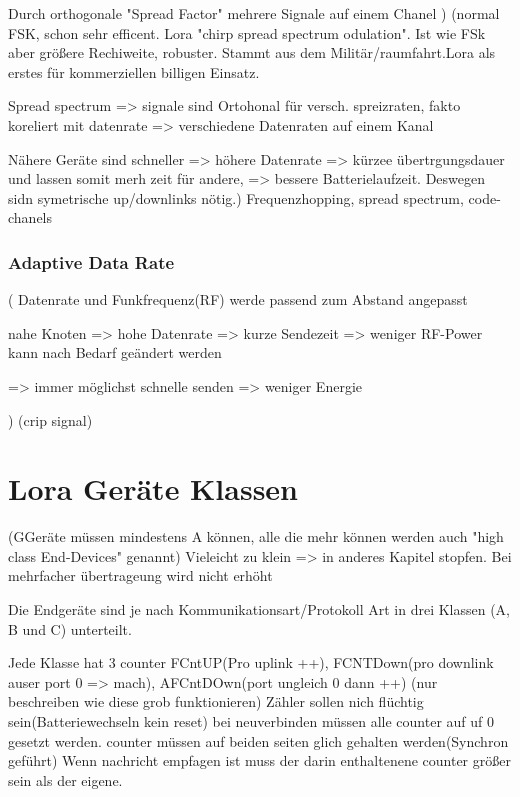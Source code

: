 \documentclass[a4paper,12pt]{article}
\begin{document}
                Durch orthogonale "Spread Factor" mehrere Signale auf einem Chanel
            )
            \cite{WhatIsLoRa}(normal FSK, schon sehr efficent. Lora "chirp spread spectrum odulation". Ist wie FSk aber größere Rechiweite, robuster. Stammt aus dem Militär/raumfahrt.Lora als erstes für kommerziellen billigen Einsatz.
            
            Spread spectrum => signale sind Ortohonal für versch. spreizraten, fakto koreliert mit datenrate => verschiedene Datenraten auf einem Kanal
            
            Nähere Geräte sind schneller => höhere Datenrate => kürzee übertrgungsdauer und lassen somit merh zeit für andere, => bessere Batterielaufzeit. Deswegen sidn symetrische up/downlinks nötig.)
            Frequenzhopping, spread spectrum, code-chanels
                \subsubsection{Adaptive Data Rate}
                \cite{LoraLimit}(
                    Datenrate und Funkfrequenz(RF) werde passend zum Abstand angepasst

                    nahe Knoten => hohe Datenrate => kurze Sendezeit => weniger RF-Power
                    kann nach Bedarf geändert werden

                    => immer möglichst schnelle senden => weniger Energie

                )
                \cite{LoraClasses}(crip signal)
    \section{Lora Geräte Klassen} \label{sec:klassen}
        \cite{LoRaSpec}(GGeräte müssen mindestens A können, alle die mehr können werden auch "high class End-Devices" genannt)
        Vieleicht zu klein => in anderes Kapitel stopfen. Bei mehrfacher übertrageung wird nicht erhöht

        Die Endgeräte sind je nach Kommunikationsart/Protokoll Art in drei Klassen (A, B und C) unterteilt. 
        
        Jede Klasse hat 3 counter FCntUP(Pro uplink ++), FCNTDown(pro downlink auser port 0 => mach), AFCntDOwn(port ungleich 0 dann ++)   (nur beschreiben wie diese grob funktionieren) Zähler sollen nich flüchtig sein(Batteriewechseln kein reset)
        bei neuverbinden müssen alle counter auf uf 0 gesetzt werden. counter müssen auf beiden seiten glich gehalten werden(Synchron geführt)
        Wenn nachricht empfagen ist muss der darin enthaltenene counter größer sein als der eigene. 
\end{document}
